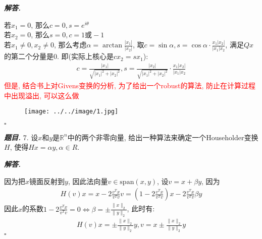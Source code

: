 \documentclass[10pt, a4paper, oneside]{ctexart}
\newcommand{\norm}[1]{\| #1 \|}
\newenvironment{problem}{\begin{framed}\par\noindent\textbf{\textit{题目. }}}{\end{framed}\par}
\newenvironment{solution}{%
  \par\noindent\textbf{\textit{解答. }}\ignorespaces
}{%
  \hfill\ensuremath{\square}\par %
}
\begin{document}
    \begin{solution}
    若$x_1=0$, 那么$c=0, s=e^{i\theta}$\\
    若$x_2=0$, 那么$s=0, c=1\text{或}-1$\\
    若$x_1\neq 0,x_2\neq 0$, 那么考虑$\alpha=\arctan \frac{|x_1|}{|x_2|}$, 取$c=\sin \alpha, s=\cos \alpha \cdot \frac{x_1|x_2|}{|x_1|x_2}$, 满足$Qx$的第二个分量是$0$. 即(实际上核心是$cx_2=sx_1$):
    \begin{align*}
        c = \frac{|x_1|}{\sqrt{|x_1|^2+|x_2|^2}}, s=\frac{|x_2|}{\sqrt{|x_1|^2+|x_2|^2}}\cdot\frac{x_1|x_2|}{|x_1|x_2}
    \end{align*}
    \textcolor{red}{但是, 结合书上对Givens变换的分析, 为了给出一个robust的算法, 防止在计算过程中出现溢出, 可以这么做}
    \begin{figure}[h]
        \centering
        \texttt{[image: ../../image/1.jpg]}
    \end{figure}
    \end{solution}
    \begin{problem}
    7. 设$x$和$y$是$\mathbb{R}^n$中的两个非零向量, 给出一种算法来确定一个Householder变换$H$, 使得$Hx=\alpha y, \alpha\in R$.
    \end{problem}
    \begin{solution}
    因为把$x$镜面反射到$y$, 因此法向量$v\in \text{span}(x,y)$, 设$v=x+\beta y$, 因为 
    \begin{align*}
    H(v)x=x-2\frac{v^Tx}{v^Tv}v=(1-2\frac{v^Tx}{v^Tv})x-2\frac{v^Tx}{v^Tv}\beta y
    \end{align*}
    因此$x$的系数$1-2\frac{v^Tx}{v^Tv}=0 \iff \beta=\pm \frac{\norm{x}_2}{\norm{y}_2}$, 此时有:
    \begin{align*}
        H(v)x=\pm \frac{\norm{x}_2}{\norm{y}_2}y, v=x\pm \frac{\norm{x}_2}{\norm{y}_2}y
    \end{align*}
    \end{solution}
    
\end{document}
